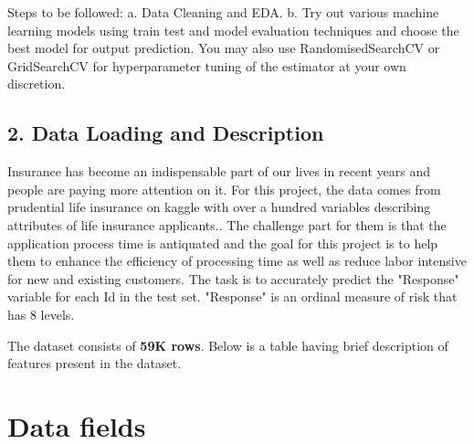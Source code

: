 \documentclass[11pt]{article}
\begin{document}
Steps to be followed: a. Data Cleaning and EDA. b. Try out various
machine learning models using train test and model evaluation techniques
and choose the best model for output prediction. You may also use
RandomisedSearchCV or GridSearchCV for hyperparameter tuning of the
estimator at your own discretion.

    

    \subsection{2. Data Loading and
Description}\label{data-loading-and-description}

    Insurance has become an indispensable part of our lives in recent years
and people are paying more attention on it. For this project, the data
comes from prudential life insurance on kaggle with over a hundred
variables describing attributes of life insurance applicants.. The
challenge part for them is that the application process time is
antiquated and the goal for this project is to help them to enhance the
efficiency of processing time as well as reduce labor intensive for new
and existing customers. The task is to accurately predict the "Response"
variable for each Id in the test set. "Response" is an ordinal measure
of risk that has 8 levels.

The dataset consists of \textbf{59K rows}. Below is a table having brief
description of features present in the dataset.

    \section{Data fields}\label{data-fields}
\end{document}
